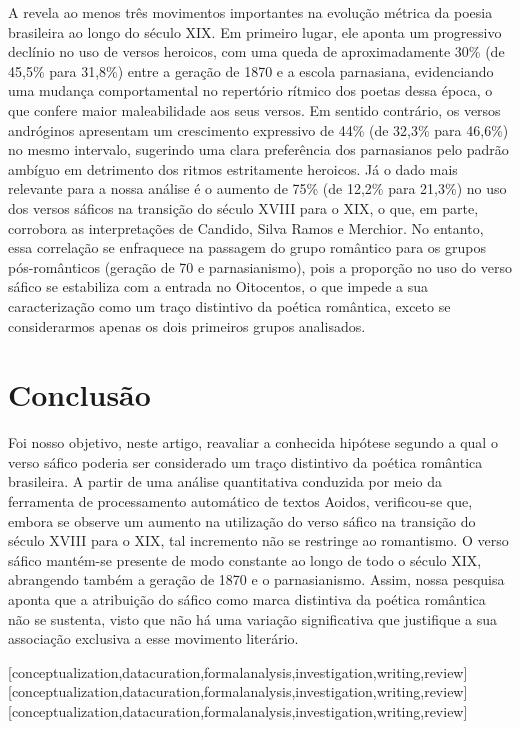 \documentclass[portuguese]{textolivre}
\begin{document}
A  revela ao menos três movimentos importantes na evolução métrica da poesia brasileira ao longo do século XIX. Em primeiro lugar, ele aponta um progressivo declínio no uso de versos heroicos, com uma queda de aproximadamente 30\% (de 45,5\% para 31,8\%) entre a geração de 1870 e a escola parnasiana, evidenciando uma mudança comportamental no repertório rítmico dos poetas dessa época, o que confere maior maleabilidade aos seus versos. Em sentido contrário, os versos andróginos apresentam um crescimento expressivo de 44\% (de 32,3\% para 46,6\%) no mesmo intervalo, sugerindo uma clara preferência dos parnasianos pelo padrão ambíguo em detrimento dos ritmos estritamente heroicos. Já o dado mais relevante para a nossa análise é o aumento de 75\% (de 12,2\% para 21,3\%) no uso dos versos sáficos na transição do século XVIII para o XIX, o que, em parte, corrobora as interpretações de Candido, Silva Ramos e Merchior. No entanto, essa correlação se enfraquece na passagem do grupo romântico para os grupos pós-românticos (geração de 70 e parnasianismo), pois a proporção no uso do verso sáfico se estabiliza com a entrada no Oitocentos, o que impede a sua caracterização como um traço distintivo da poética romântica, exceto se considerarmos apenas os dois primeiros grupos analisados.

\section{Conclusão}\label{sec-fmt-manuscrito}
Foi nosso objetivo, neste artigo, reavaliar a conhecida hipótese segundo a qual o verso sáfico poderia ser considerado um traço distintivo da poética romântica brasileira. A partir de uma análise quantitativa conduzida por meio da ferramenta de processamento automático de textos Aoidos, verificou-se que, embora se observe um aumento na utilização do verso sáfico na transição do século XVIII para o XIX, tal incremento não se restringe ao romantismo. O verso sáfico mantém-se presente de modo constante ao longo de todo o século XIX, abrangendo também a geração de 1870 e o parnasianismo. Assim, nossa pesquisa aponta que a atribuição do sáfico como marca distintiva da poética romântica não se sustenta, visto que não há uma variação significativa que justifique a sua associação exclusiva a esse movimento literário.



\printbibliography\label{sec-bib}
\begin{contributors}
[conceptualization,datacuration,formalanalysis,investigation,writing,review]
[conceptualization,datacuration,formalanalysis,investigation,writing,review]
[conceptualization,datacuration,formalanalysis,investigation,writing,review]
\end{contributors}
\end{document}
